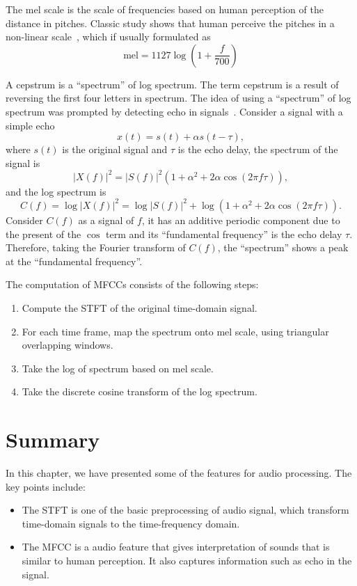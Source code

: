 \documentclass[12pt,final,twoside]{report}
\begin{document}
The mel scale is the scale of frequencies based on human perception of the distance in pitches. Classic study shows that human perceive the pitches in a non-linear scale~\cite{stevens_scale_1937}, which if usually formulated as~\cite{oshaughnessy_speech_1987}
\begin{equation}
  \text{mel} = 1127 \log (1 + \frac{f}{700})
\end{equation}

A cepstrum is a ``spectrum'' of log spectrum. The term cepstrum is a result of reversing the first four letters in spectrum. The idea of using a ``spectrum'' of log spectrum was prompted by detecting echo in signals~\cite{oppenheim_frequency_2004}. Consider a signal with a simple echo
\begin{equation}
  x(t) = s(t) + \alpha s(t - \tau),
\end{equation}
where $s(t)$ is the original signal and $\tau$ is the echo delay, the spectrum of the signal is
\begin{equation}
  \left| X(f) \right|^2 = \left| S(f) \right|^2 (1 + \alpha^2 + 2 \alpha \cos(2 \pi f \tau)),
\end{equation}
and the log spectrum is
\begin{equation}
  C(f) = \log \left| X(f) \right|^2 = \log \left| S(f) \right|^2 + \log (1 + \alpha^2 + 2 \alpha \cos(2 \pi f \tau)).
\end{equation}
Consider $C(f)$ as a signal of $f$, it has an additive periodic component due to the present of the $\cos$ term and its ``fundamental frequency'' is the echo delay $\tau$. Therefore, taking the Fourier transform of $C(f)$, the ``spectrum'' shows a peak at the ``fundamental frequency''. 

The computation of MFCCs consists of the following steps:
\begin{enumerate}
  \item Compute the STFT of the original time-domain signal.
  \item For each time frame, map the spectrum onto mel scale, using triangular overlapping windows.
  \item Take the log of spectrum based on mel scale.
  \item Take the discrete cosine transform of the log spectrum.
\end{enumerate}

\section{Summary}
In this chapter, we have presented some of the features for audio processing. The key points include:
\begin{itemize}
  \item The STFT is one of the basic preprocessing of audio signal, which transform time-domain signals to the time-frequency domain.
  \item The MFCC is a audio feature that gives interpretation of sounds that is similar to human perception. It also captures information such as echo in the signal.
\end{itemize}
\end{document}
